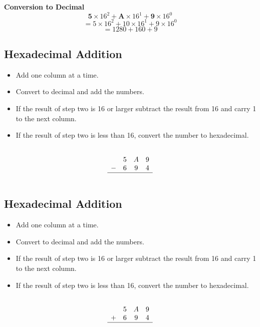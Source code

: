 \documentclass[a4paper,12pt]{article}
\begin{document}
\textbf{Conversion to Decimal}
\[\textbf{5} \times 16^2 + \textbf{A} \times 16^1  + \textbf{9} \times 16^0\]
\[=5 \times 16^2 + 10 \times 16^1  + 9 \times 16^0\]
\[= 1280 + 160 + 9\]



\subsection*{Hexadecimal Addition}
\begin{itemize}
\item		Add one column at a time.

\item		Convert to decimal and add the numbers.

\item	If the result of step two is 16 or larger subtract the result from 16 and carry 1 to the next column.

\item	If the result of step two is less than 16, convert the number to hexadecimal.

\end{itemize}

\[\begin{array}{cccc}
	&		&		&		\\	
	&	5	&	A	&	9	\\	
	-&	6	&	9	&	4	\\	\hline
	&		&		&		\\	
\end{array}\]

\subsection*{Hexadecimal Addition}
\begin{itemize}
\item		Add one column at a time.

\item		Convert to decimal and add the numbers.

\item	If the result of step two is 16 or larger subtract the result from 16 and carry 1 to the next column.

\item	If the result of step two is less than 16, convert the number to hexadecimal.

\end{itemize}
\[\begin{array}{cccc}
	&		&		&		\\	
	&	5	&	A	&	9	\\	
	+&	6	&	9	&	4	\\	\hline
	&		&		&		\\	
\end{array} \]
\end{document}
